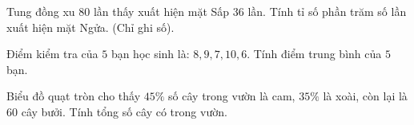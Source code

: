 \begin{ex} %
Tung đồng xu $80$ lần thấy xuất hiện mặt Sấp $36$ lần. Tính tỉ số phần trăm số lần xuất hiện mặt Ngửa. (Chỉ ghi số).
\end{ex}

\begin{ex} %
Điểm kiểm tra của $5$ bạn học sinh là: $8, 9, 7, 10, 6$. Tính điểm trung bình của $5$ bạn.
\end{ex}

\begin{ex} %
Biểu đồ quạt tròn cho thấy $45\%$ số cây trong vườn là cam, $35\%$ là xoài, còn lại là $60$ cây bưởi. Tính tổng số cây có trong vườn.
\end{ex}
